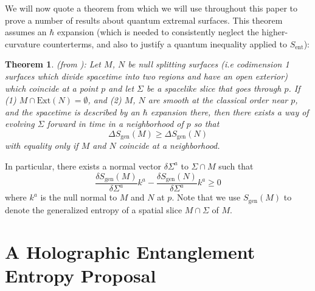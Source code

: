 \documentclass[12pt]{article}
\newtheorem{thm}{Theorem}[section]
\theoremstyle{remark}
\numberwithin{equation}{section}
\numberwithin{equation}{section}
\begin{document}
%

We will now quote a theorem from \cite{Wall12} which we will use throughout this paper to prove a number of results about quantum extremal surfaces. This theorem assumes an $\hbar$ expansion (which is needed to consistently neglect the higher-curvature counterterms, and also to justify a quantum inequality applied to $S_\mathrm{ent}$):

\begin{thm}\label{Wall12Thm1}(from \cite{Wall12}): Let $M$, $N$ be null splitting surfaces (i.e codimension 1 surfaces which divide spacetime into two regions \cite{EngelhardtWall} and have an open exterior) which coincide at a point $p$ and let $\Sigma$ be a spacelike slice that goes through $p$. If (1) $M\cap \text{Ext}(N)=\emptyset$, and (2) $M$, $N$ are smooth at the classical order near $p$, and the spacetime is described by an $\hbar$ expansion there, then there exists a way of evolving $\Sigma$ forward in time in a neighborhood of $p$ so that 
\begin{equation} 
\Delta S_\mathrm{gen}\left (M\right)\geq \Delta S_\mathrm{gen}\left(N\right)
\end{equation}
 with equality only if $M$ and $N$ coincide at a neighborhood.
\end{thm}

\noindent In particular, there exists a normal vector $\delta \Sigma^{a}$ to $\Sigma\cap M$ such that 
\begin{equation} \frac{\delta S_\mathrm{gen}\left(M\right)}{\delta \Sigma^{a}}k^{a} - \frac{\delta S_\mathrm{gen}\left(N\right)}{\delta \Sigma^{a}}k^{a}\geq 0 \label{Diff}\end{equation}
where $k^{a}$ is the null normal to $M$ and $N$ at $p$. Note that 
we use $S_\mathrm{gen}(M)$ to denote the generalized entropy of a spatial slice $M\cap \Sigma$  of $M$. 

\section{A Holographic Entanglement Entropy Proposal} \label{EE}
\end{document}

